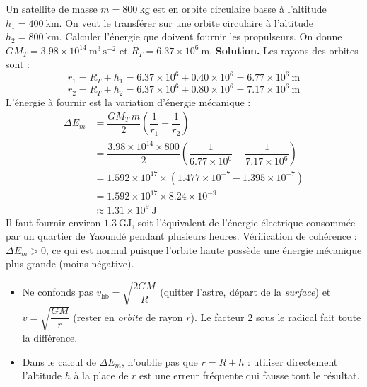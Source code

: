 \documentclass[11pt]{article}
\begin{document}
\begin{exoresolu}
Un satellite de masse $m = 800\ \mathrm{kg}$ est en orbite circulaire basse à l'altitude $h_1 = 400\ \mathrm{km}$. On veut le transférer sur une orbite circulaire à l'altitude $h_2 = 800\ \mathrm{km}$. Calculer l'énergie que doivent fournir les propulseurs. On donne $GM_T = \num{3,98}\times 10^{14}\ \mathrm{m^3\,s^{-2}}$ et $R_T = \num{6,37}\times 10^{6}\ \mathrm{m}$.
\tcblower
\textbf{Solution.} Les rayons des orbites sont :
\[ r_1 = R_T + h_1 = \num{6,37}\times 10^{6} + \num{0,40}\times 10^{6} = \num{6,77}\times 10^{6}\ \mathrm{m} \]
\[ r_2 = R_T + h_2 = \num{6,37}\times 10^{6} + \num{0,80}\times 10^{6} = \num{7,17}\times 10^{6}\ \mathrm{m} \]
L'énergie à fournir est la variation d'énergie mécanique :
\begin{align*}
\Delta E_m &= \dfrac{GM_T\,m}{2}\left(\dfrac{1}{r_1} - \dfrac{1}{r_2}\right) \\
&= \dfrac{\num{3,98}\times 10^{14}\times 800}{2}\left(\dfrac{1}{\num{6,77}\times 10^{6}} - \dfrac{1}{\num{7,17}\times 10^{6}}\right) \\
&= \num{1,592}\times 10^{17}\times\left(\num{1,477}\times 10^{-7} - \num{1,395}\times 10^{-7}\right) \\
&= \num{1,592}\times 10^{17}\times \num{8,24}\times 10^{-9} \\
&\approx \num{1,31}\times 10^{9}\ \mathrm{J}
\end{align*}
Il faut fournir environ $\num{1,3}\ \mathrm{GJ}$, soit l'équivalent de l'énergie électrique consommée par un quartier de Yaoundé pendant plusieurs heures. Vérification de cohérence : $\Delta E_m > 0$, ce qui est normal puisque l'orbite haute possède une énergie mécanique plus grande (moins négative).
\end{exoresolu}

\begin{attention}
\begin{itemize}
\item Ne confonds pas $v_{\text{lib}} = \sqrt{\dfrac{2GM}{R}}$ (quitter l'astre, départ de la \emph{surface}) et $v = \sqrt{\dfrac{GM}{r}}$ (rester en \emph{orbite} de rayon $r$). Le facteur $2$ sous le radical fait toute la différence.
\item Dans le calcul de $\Delta E_m$, n'oublie pas que $r = R + h$ : utiliser directement l'altitude $h$ à la place de $r$ est une erreur fréquente qui fausse tout le résultat.
\end{itemize}
\end{attention}
\end{document}

